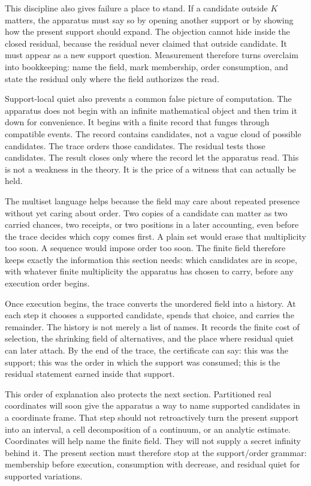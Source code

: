 This discipline also gives failure a place to stand. If a candidate outside
\(K\) matters, the apparatus must say so by opening another support or by
showing how the present support should expand. The objection cannot hide
inside the closed residual, because the residual never claimed that outside
candidate. It must appear as a new support question. Measurement therefore
turns overclaim into bookkeeping: name the field, mark membership, order
consumption, and state the residual only where the field authorizes the read.

Support-local quiet also prevents a common false picture of computation. The
apparatus does not begin with an infinite mathematical object and then trim it
down for convenience. It begins with a finite record that funges through compatible events. The record contains candidates, not a vague cloud
of possible candidates. The trace orders those candidates. The residual tests
those candidates. The result closes only where the record let the apparatus
read. This is not a weakness in the theory. It is the price of a witness that
can actually be held.

The multiset language helps because the field may care about repeated
presence without yet caring about order. Two copies of a candidate can matter
as two carried chances, two receipts, or two positions in a later accounting,
even before the trace decides which copy comes first. A plain set would erase
that multiplicity too soon. A sequence would impose order too soon. The finite
field therefore keeps exactly the information this section needs: which
candidates are in scope, with whatever finite multiplicity the apparatus has
chosen to carry, before any execution order begins.

Once execution begins, the trace converts the unordered field into a history.
At each step it chooses a supported candidate, spends that choice, and carries
the remainder. The history is not merely a list of names. It records the
finite cost of selection, the shrinking field of alternatives, and the place
where residual quiet can later attach. By the end of the trace, the certificate
can say: this was the support; this was the order in which the support was
consumed; this is the residual statement earned inside that support.

This order of explanation also protects the next section. Partitioned real
coordinates will soon give the apparatus a way to name supported candidates in
a coordinate frame. That step should not retroactively turn the present
support into an interval, a cell decomposition of a continuum, or an analytic
estimate. Coordinates will help name the finite field. They will not supply a
secret infinity behind it. The present section must therefore stop at the
support/order grammar: membership before execution, consumption with decrease,
and residual quiet for supported variations.

